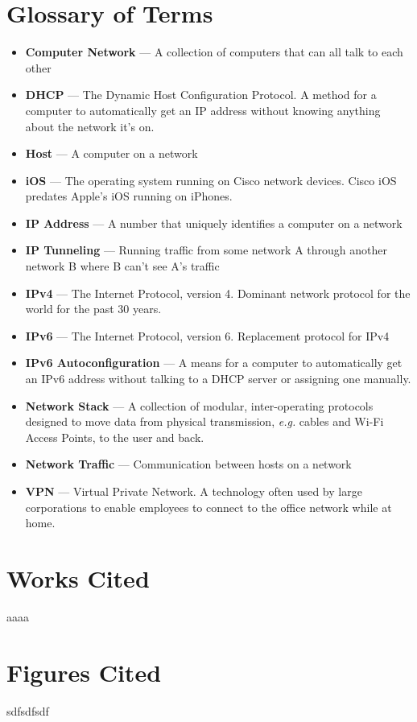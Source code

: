 \documentclass[12pt]{article}
\begin{document}
\section{Glossary of Terms}

\begin{itemize}
\item[] \textbf{Computer Network} --- A collection of computers that can all talk to each other
\item[] \textbf{DHCP} --- The Dynamic Host Configuration Protocol. A method for a computer to automatically get an IP address without knowing anything about the network it's on.
\item[] \textbf{Host} --- A computer on a network
\item[] \textbf{iOS} --- The operating system running on Cisco network devices. Cisco iOS predates Apple's iOS running on iPhones.
\item[] \textbf{IP Address} --- A number that uniquely identifies a computer on a network
\item[] \textbf{IP Tunneling} --- Running traffic from some network A  through another network B where B can't see A's traffic
\item[] \textbf{IPv4} --- The Internet Protocol, version 4. Dominant network protocol for the world for the past 30 years.
\item[] \textbf{IPv6} --- The Internet Protocol, version 6. Replacement protocol for IPv4
\item[] \textbf{IPv6 Autoconfiguration} --- A means for a computer to automatically get an IPv6 address without talking to a DHCP server or assigning one manually.
\item[] \textbf{Network Stack} --- A collection of modular, inter-operating protocols designed to move data from physical transmission, \textit{e.g.} cables and Wi-Fi Access Points, to the user and back.
\item[] \textbf{Network Traffic} --- Communication between hosts on a network
\item[] \textbf{VPN} --- Virtual Private Network. A technology often used by large corporations to enable employees to connect to the office network while at home.
\end{itemize}

\section{Works Cited}
aaaa

\begingroup
\let\clearpage\relax
\section{Figures Cited}
sdfsdfsdf
\endgroup
\end{document}
